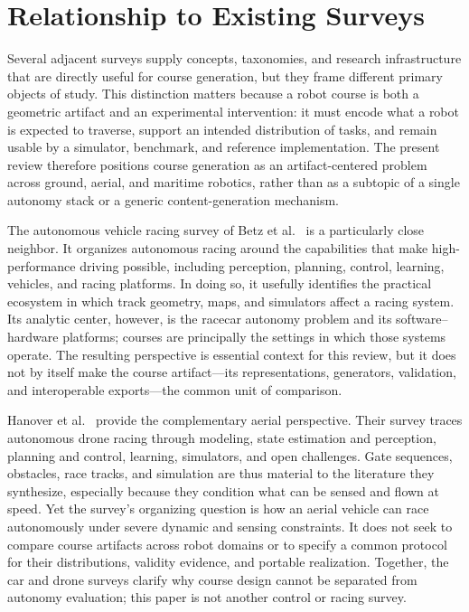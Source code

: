 \section{Relationship to Existing Surveys}
\label{sec:adjacent-surveys}

Several adjacent surveys supply concepts, taxonomies, and research infrastructure
that are directly useful for course generation, but they frame different primary
objects of study. This distinction matters because a robot course is both a
geometric artifact and an experimental intervention: it must encode what a robot
is expected to traverse, support an intended distribution of tasks, and remain
usable by a simulator, benchmark, and reference implementation. The present
review therefore positions course generation as an artifact-centered problem
across ground, aerial, and maritime robotics, rather than as a subtopic of a
single autonomy stack or a generic content-generation mechanism.

The autonomous vehicle racing survey of Betz et al.\ \cite{Betz2022AutonomousVehicles}
is a particularly close neighbor. It organizes autonomous racing around the
capabilities that make high-performance driving possible, including perception,
planning, control, learning, vehicles, and racing platforms. In doing so, it
usefully identifies the practical ecosystem in which track geometry, maps, and
simulators affect a racing system. Its analytic center, however, is the racecar
autonomy problem and its software--hardware platforms; courses are principally
the settings in which those systems operate. The resulting perspective is
essential context for this review, but it does not by itself make the course
artifact---its representations, generators, validation, and interoperable
exports---the common unit of comparison.

Hanover et al.\ \cite{Hanover2023AutonomousDrone} provide the complementary
aerial perspective. Their survey traces autonomous drone racing through modeling,
state estimation and perception, planning and control, learning, simulators, and
open challenges. Gate sequences, obstacles, race tracks, and simulation are thus
material to the literature they synthesize, especially because they condition
what can be sensed and flown at speed. Yet the survey's organizing question is
how an aerial vehicle can race autonomously under severe dynamic and sensing
constraints. It does not seek to compare course artifacts across robot domains or
to specify a common protocol for their distributions, validity evidence, and
portable realization. Together, the car and drone surveys clarify why course
design cannot be separated from autonomy evaluation; this paper is not another
control or racing survey.

